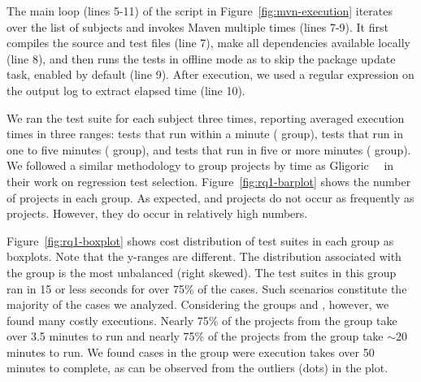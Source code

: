 The main loop (lines 5-11) of the script in
Figure~\ref{fig:mvn-execution} iterates over the list of subjects and
invokes Maven multiple times (lines 7-9).  It first compiles the source and test files
(line 7), make all dependencies available locally (line 8), and then
runs the tests in offline mode as to skip the package update task,
enabled by default (line 9). After execution, we used a regular
expression on the output log to extract elapsed time (line 10).




We ran the test suite for each subject three times, reporting averaged
execution times in three ranges: tests that run within a minute
(\shortg{} group), tests that run in one to five minutes (\medg{}
group), and tests that run in five or more minutes (\longg{}
group). We followed a similar methodology to group projects by time as
Gligoric~\etal{}~\cite{gligoric-etal-issta2015} in their work on
regression test selection. Figure~\ref{fig:rq1-barplot} shows the number of projects in
each group.  As expected, \longg{} and \medg{} projects do not occur
as frequently as \shortg{} projects.  However, they do occur in
relatively high numbers.

Figure~\ref{fig:rq1-boxplot} shows cost distribution of test suites in
each group as boxplots.  Note that the y-ranges are different.  The
distribution associated with the \shortg{} group is the most
unbalanced (right skewed).  The test suites in this group ran in 15 or less seconds for
over 75\% of the cases.  Such scenarios constitute the majority of the
cases we analyzed.  Considering the groups \medg{} and \longg{},
however, we found many costly executions.  Nearly 75\% of the projects
from the \medg{} group take over 3.5 minutes to run and nearly 75\% of
the projects from the \longg{} group take $\sim$20 minutes to run.  We
found cases in the \longg{} group were execution takes over 50 minutes
to complete, as can be observed from the outliers (dots) in the plot.




